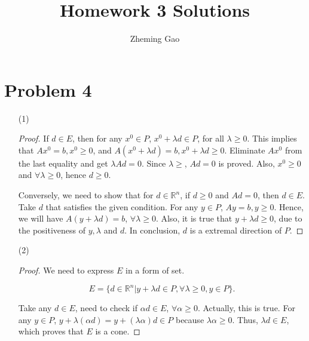 \documentclass[12pt]{article}
\begin{document}
 
 
\title{Homework 3 Solutions}
\author{Zheming Gao}
\maketitle


\section*{Problem 4}

\begin{enumerate}
\item[(1)]
\begin{proof}

If $d\in E$, then for any $x^0 \in P$, $x^0+\lambda d \in P$, for all $\lambda \geqslant 0$. This implies that $Ax^0 = b, x^0 \geqslant 0$, and $A(x^0 + \lambda d) = b, x^0 + \lambda d \geqslant 0$. Eliminate $Ax^0$ from the last equality and get $\lambda Ad = 0$. Since $\lambda \geqslant$, $Ad = 0$ is proved.
Also, $x^0 \geqslant 0$ and $\forall \lambda \geqslant 0$, hence $d \geqslant 0$.

Conversely, we need to show that for $d\in\mathbb R^n$, if $d \geqslant 0$ and $Ad = 0$, then $d\in E$. Take $d$ that satisfies the given condition. For any $y \in P$, $Ay = b, y \geqslant 0$. Hence, we will have $A(y + \lambda d) = b$, $\forall \lambda \geqslant 0$. Also, it is true that $y + \lambda d \geqslant 0$, due to the positiveness of $y, \lambda$ and $d$. In conclusion, $d$ is a extremal direction of $P$.
\end{proof}

\item[(2)]

\begin{proof}

We need to express $E$ in a form of set.

$$
E = \{d \in \mathbb{R}^n | y + \lambda d \in P, \forall \lambda \geqslant 0, y\in P \}.
$$

Take any $d \in E$, need to check if $\alpha d\in E$, $\forall \alpha \geqslant 0$. Actually, this is true. For any $y\in P$, $y + \lambda (\alpha d) = y + (\lambda\alpha)d \in P$ because $\lambda\alpha \geqslant 0$. Thus, $\lambda d\in E$, which proves that $E$ is a cone.


\end{proof}
\end{enumerate}
\end{document}
